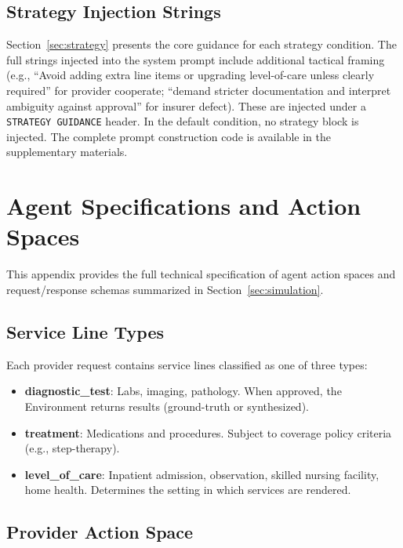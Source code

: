 \subsection{Strategy Injection Strings}
\label{sec:strategy-strings}

Section~\ref{sec:strategy} presents the core guidance for each strategy condition. The full strings injected into the system prompt include additional tactical framing (e.g., ``Avoid adding extra line items or upgrading level-of-care unless clearly required'' for provider cooperate; ``demand stricter documentation and interpret ambiguity against approval'' for insurer defect). These are injected under a \texttt{STRATEGY GUIDANCE} header. In the default condition, no strategy block is injected. The complete prompt construction code is available in the supplementary materials.

\section{Agent Specifications and Action Spaces}
\label{sec:agent-details}

This appendix provides the full technical specification of agent action spaces and request/response schemas summarized in Section~\ref{sec:simulation}.

\subsection{Service Line Types}

Each provider request contains service lines classified as one of three types:
\begin{itemize}
    \item \textbf{diagnostic\_test}: Labs, imaging, pathology. When approved, the Environment returns results (ground-truth or synthesized).
    \item \textbf{treatment}: Medications and procedures. Subject to coverage policy criteria (e.g., step-therapy).
    \item \textbf{level\_of\_care}: Inpatient admission, observation, skilled nursing facility, home health. Determines the setting in which services are rendered.
\end{itemize}

\subsection{Provider Action Space}

